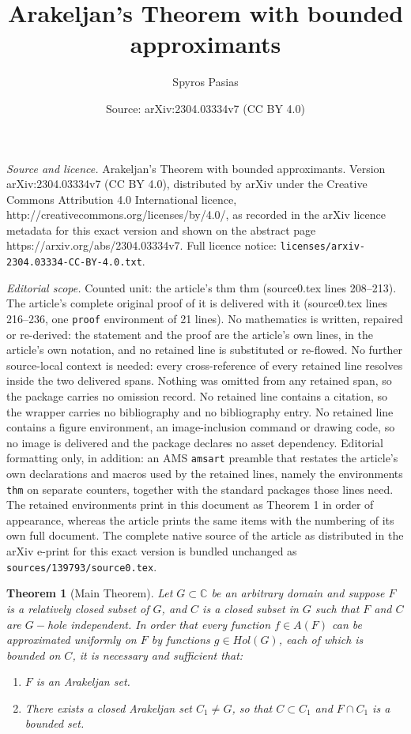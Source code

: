 \documentclass[10pt,a4paper]{amsart}
\title{Arakeljan's Theorem with bounded approximants}
\author{Spyros Pasias}
\date{Source: arXiv:2304.03334v7 (CC BY 4.0)}
\newtheorem{thm}{Theorem}
\begin{document}
\maketitle

\noindent\emph{Source and licence.} Arakeljan's Theorem with bounded approximants. Version arXiv:2304.03334v7 (CC BY 4.0), distributed by arXiv under the Creative Commons Attribution 4.0 International licence, http://creativecommons.org/licenses/by/4.0/, as recorded in the arXiv licence metadata for this exact version and shown on the abstract page https://arxiv.org/abs/2304.03334v7. Full licence notice: \texttt{licenses/arxiv-2304.03334-CC-BY-4.0.txt}.\par\smallskip

\noindent\textit{Editorial scope.} Counted unit: the article's thm thm (source0.tex lines 208--213). The article's complete original proof of it is delivered with it (source0.tex lines 216--236, one \texttt{proof} environment of 21 lines). No mathematics is written, repaired or re-derived: the statement and the proof are the article's own lines, in the article's own notation, and no retained line is substituted or re-flowed.  No further source-local context is needed: every cross-reference of every retained line resolves inside the two delivered spans.  Nothing was omitted from any retained span, so the package carries no omission record.  No retained line contains a citation, so the wrapper carries no bibliography and no bibliography entry.  No retained line contains a figure environment, an image-inclusion command or drawing code, so no image is delivered and the package declares no asset dependency.  Editorial formatting only, in addition: an AMS \texttt{amsart} preamble that restates the article's own declarations and macros used by the retained lines, namely the environments \texttt{thm} on separate counters, together with the standard packages those lines need.  The retained environments print in this document as Theorem 1 in order of appearance, whereas the article prints the same items with the numbering of its own full document.  The complete native source of the article as distributed in the arXiv e-print for this exact version is bundled unchanged as \texttt{sources/139793/source0.tex}.
\begin{thm}[Main Theorem]
Let $G\subset \mathbb{C}$ be an arbitrary domain and suppose $F$ is a relatively closed subset of $G$, and $C$ is a closed subset in $G$ such that \(F\) and \(C\) are \(G-\)hole independent. In order that every function $f\in A(F)$ can be approximated uniformly on $F$ by functions $g\in Hol(G)$, each of which is bounded on $C$, it is necessary and sufficient that: \begin{enumerate}
\item $F$ is an Arakeljan set.
\item There exists a closed Arakeljan set $C_1\not=G$, so that $C\subset C_1$ and $F\cap C_1$ is a bounded set.
\end{enumerate}
\end{thm}
\end{document}
